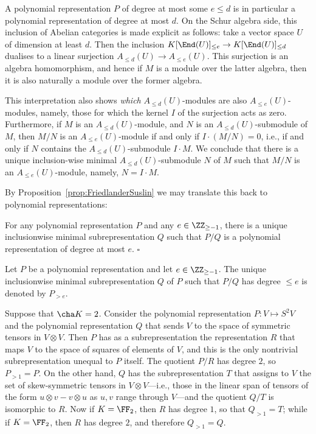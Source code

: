 \documentclass{amsart}
\begin{document}
A polynomial representation $P$ of degree at most some $e \leq d$ is
in particular a polynomial representation of degree at most $d$. On the
Schur algebra side, this inclusion of Abelian categories is made explicit
as follows: take a vector space $U$ of dimension at least $d$. Then the
inclusion $K[\End(U)]_{\leq e} \to K[\End(U)]_{\leq d}$
dualises to a
linear surjection $A_{\leq d}(U) \to A_{\leq e}(U)$. This surjection is
an algebra homomorphism, and hence if $M$ is a module over the latter
algebra, then it is also naturally a module over the former algebra.

This interpretation also shows {\em which} $A_{\leq d}(U)$-modules are
also $A_{\leq e}(U)$-modules, namely, those for which the kernel $I$
of the surjection acts as zero. Furthermore, if $M$ is an $A_{\leq
d}(U)$-module, and $N$ is an $A_{\leq d}(U)$-submodule of $M$, then
$M/N$ is an $A_{\leq e}(U)$-module if and only if $I \cdot (M/N)=0$,
i.e., if and only if $N$ contains the $A_{\leq d}(U)$-submodule $I \cdot
M$. We conclude that there is a unique inclusion-wise minimal $A_{\leq
d}(U)$-submodule $N$ of $M$ such that $M/N$ is an $A_{\leq e}(U)$-module,
namely, $N=I \cdot M$. 

By Proposition~\ref{prop:FriedlanderSuslin} we may translate this back to
polynomial representations: 

\begin{prop}
For any polynomial representation $P$ and any $e \in \ZZ_{\geq -1}$,
there is a unique inclusionwise minimal subrepresentation $Q$ such that
$P/Q$ is a polynomial representation of degree at most $e$.
\hfill $\square$
\end{prop}

\begin{de}
Let $P$ be a polynomial representation and let $e \in \ZZ_{\geq -1}$. 
The unique inclusionwise minimal subrepresentation $Q$ of $P$ such that $P/Q$
has degree $\leq e$ is denoted by $P_{>e}$. 
\end{de}

\begin{ex}
Suppose that $\cha K=2$.  Consider the polynomial representation $P:V
\mapsto S^2 V$ and the polynomial representation $Q$ that sends $V$
to the space of symmetric tensors in $V \otimes V$. Then $P$ has
as a subrepresentation the representation $R$ that maps $V$ to the
space of squares of elements of $V$, and this is the only nontrivial
subrepresentation unequal to $P$ itself. The quotient $P/R$ has degree
$2$, so $P_{>1}=P$. On the other hand, $Q$ has the subrepresentation $T$
that assigns to $V$ the set of skew-symmetric tensors in $V
\otimes V$---i.e., those in the linear span of tensors of
the form $u \otimes v - v \otimes u$ as $u,v$ range through
$V$---and the quotient $Q/T$ is isomorphic to $R$. Now if
$K=\FF_2$, then $R$ has degree $1$, so that $Q_{>1}=T$;
while if $K=\FF_2$, then $R$ has degree $2$, and therefore
$Q_{>1}=Q$.
\end{ex}
\end{document}
